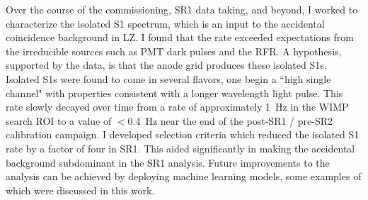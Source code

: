 Over the course of the commissioning, SR1 data taking, and beyond, I worked to characterize the isolated S1 spectrum, which is an input to the accidental coincidence background in LZ.
I found that the rate exceeded expectations from the irreducible sources such as PMT dark pulses and the RFR.
A hypothesis, supported by the data, is that the anode grid produces these isolated S1s.
Isolated S1s were found to come in several flavors, one begin a ``high single channel" with properties consistent with a longer wavelength light pulse.
This rate slowly decayed over time from a rate of approximately 1~Hz in the WIMP search ROI to a value of $<$0.4~Hz near the end of the post-SR1 / pre-SR2 calibration campaign.
I developed selection criteria which reduced the isolated S1 rate by a factor of four in SR1.
This aided significantly in making the accidental background subdominant in the SR1 analysis.
Future improvements to the analysis can be achieved by  deploying machine learning models, some examples of which were discussed in this work.

